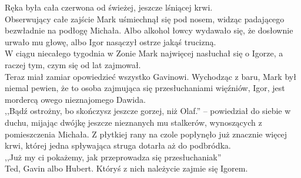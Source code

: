 \documentclass[../MAIN.tex]{subfiles}
\begin{document}
Ręka była cała czerwona od świeżej, jeszcze lśniącej krwi.\\
Obserwujący całe zajście Mark uśmiechnął się pod nosem, widząc padającego bezwładnie na podłogę Michała. Albo alkohol łowcy wydawało się, że dosłownie urwało mu głowę, albo Igor nasączył ostrze jakąś trucizną.\\
W ciągu niecałego tygodnia w Zonie Mark najwięcej nasłuchał się o Igorze, a raczej tym, czym się od lat zajmował.\\
Teraz miał zamiar opowiedzieć wszystko Gavinowi. Wychodząc z baru, Mark był niemal pewien, że to osoba zajmująca się przesłuchaniami więźniów, Igor, jest mordercą owego nieznajomego Dawida.\\
,,Bądź ostrożny, bo skończysz jeszcze gorzej, niż Olaf.'' -- powiedział do siebie w duchu, mijając dwójkę jeszcze nieznanych mu stalkerów, wynoszących z pomieszczenia Michała. Z płytkiej rany na czole popłynęło już znacznie więcej krwi, której jedna spływająca struga dotarła aż do podbródka.\\
,,Już my ci pokażemy, jak przeprowadza się przesłuchania\3k''\\
Ted, Gavin albo Hubert. Któryś z nich należycie zajmie się Igorem.
\end{document}
